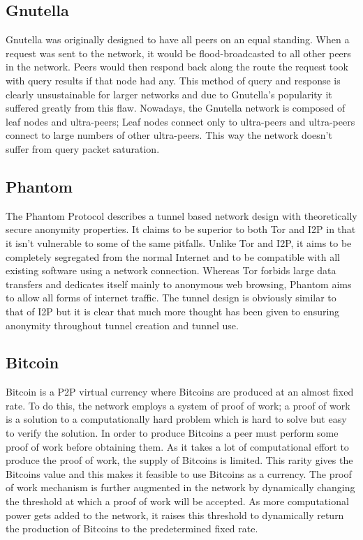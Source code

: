 \documentclass[ %
                    author={Luke Murray},
                supervisor={Dr. Simon Hollis},
                     title={Shadow Peer-to-Peer Networks},
                  subtitle={},
                    degree={MEng},
                      year={2013} ]{thesis}
\begin{document}
\subsection{Gnutella}

Gnutella\cite{Gnutella} was originally designed to have all peers on an equal standing. When a request was sent to the network, it would be flood-broadcasted to all other peers in the network. Peers would then respond back along the route the request took with query results if that node had any. This method of query and response is clearly unsustainable for larger networks and due to Gnutella's  popularity it suffered greatly from this flaw. Nowadays, the Gnutella network is composed of leaf nodes and ultra-peers; Leaf nodes connect only to ultra-peers and ultra-peers connect to large numbers of other ultra-peers. This way the network doesn't suffer from query packet saturation.

\subsection{Phantom}

The Phantom Protocol\cite{Phantom} describes a tunnel based network design with theoretically secure anonymity properties. It claims to be superior to both Tor and I2P in that it isn't vulnerable to some of the same pitfalls. Unlike Tor and I2P, it aims to be completely segregated from the normal Internet and to be compatible with all existing software using a network connection. Whereas Tor forbids large data transfers and dedicates itself mainly to anonymous web browsing, Phantom aims to allow all forms of internet traffic. The tunnel design is obviously similar to that of I2P but it is clear that much more thought has been given to ensuring anonymity throughout tunnel creation and tunnel use.

\subsection{Bitcoin}

Bitcoin\cite{Bitcoin} is a P2P virtual currency where Bitcoins are produced at an almost fixed rate. To do this, the network employs a system of proof of work; a proof of work is a solution to a computationally hard problem which is hard to solve but easy to verify the solution. In order to produce Bitcoins a peer must perform some proof of work before obtaining them. As it takes a lot of computational effort to produce the proof of work, the supply of Bitcoins is limited. This rarity gives the Bitcoins value and this makes it feasible to use Bitcoins as a currency. The proof of work mechanism is further augmented in the network by dynamically changing the threshold at which a proof of work will be accepted. As more computational power gets added to the network, it raises this threshold to dynamically return the production of Bitcoins to the predetermined fixed rate.
\end{document}
